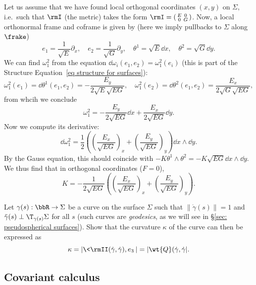 \begin{example}\label{ex Gauss curvature in orthogonal coords}
    Let us assume that we have found local orthogonal coordinates $(x,y)$ on $\Sigma$, i.e.\ such that $\rmI$ (the metric) takes the form $\rmI=\left(\begin{smallmatrix}
        E & 0\\
        0 & G
    \end{smallmatrix}\right)$.
    Now, a local orthonormal frame and coframe is given by (here we imply pullbacks to $\Sigma$ along $\frake$)
    \[e_1=\frac{1}{\sqrt{E}}\partial_x,\quad e_2=\frac{1}{\sqrt{G}}\partial_y,\quad \theta^1=\sqrt{E}\dd x,\quad \theta^2=\sqrt{G}\dd y.\]
    We can find $\omega_1^2$ from the equation $\dd\omega_i(e_1,e_2)=\omega_1^2(e_i)$ (this is part of the Structure Equation~\ref{eq structure for surfaces}):
    \[\omega_1^2(e_1)=\dd\theta^1(e_1,e_2)=-\frac{E_y}{2\sqrt{E}\sqrt{EG}},\quad \omega_1^2(e_2)=\dd\theta^2(e_1,e_2)=\frac{E_x}{2\sqrt{G}\sqrt{EG}},\]
    from whcih we conclude 
    \[\omega_1^2=-\frac{E_y}{2\sqrt{EG}}\dd x+\frac{E_x}{2\sqrt{EG}}\dd y.\]
    Now we compute its derivative:
    \[\dd\omega_1^2=\frac12\left(\left(\frac{E_x}{\sqrt{EG}}\right)_x+\left(\frac{E_y}{\sqrt{EG}}\right)_y\right)\dd x\wedge\dd y.\]
    By the Gauss equation, this should coincide with $-K\theta^1\wedge\theta^2=-K\sqrt{EG}\dd x\wedge\dd y$. We thus find that in orthogonal coordinates ($F=0$), 
    \[K=-\frac{1}{2\sqrt{EG}}\left(\left(\frac{E_x}{\sqrt{EG}}\right)_x+\left(\frac{E_y}{\sqrt{EG}}\right)_y\right).\label{eq K in orthogonal coords}\]
\end{example}


\begin{xca}
    Let $\gamma(s):\bbR\to \Sigma$ be a curve on the surface $\Sigma$ such that $\lVert\dot\gamma(s)\rVert=1$ and $\ddot\gamma(s)\perp \T_{\gamma(s)}\Sigma$ for all $s$ (such curves are \emph{geodesics}, as we will see in \S\ref{sec: pseudospherical surfaces}). Show that the curvature $\kappa$ of the curve can then be expressed as
    \[\kappa=\left|\<\rmII(\dot\gamma,\dot\gamma),e_3\>\right|=|\wt{Q}(\dot\gamma,\dot\gamma|.\]
\end{xca}







\subsection{Covariant calculus}


